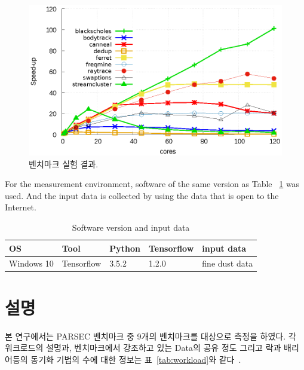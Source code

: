\documentclass{kcc}
\begin{document}
\begin{figure}[tb!]
    \centering
    \includegraphics[width=4.8in]{graph/PARSEC.eps}
    \caption{벤치마크 실험 결과.}
    \label{fig:parsec}
\end{figure}

For the measurement environment, software of the same version as Table ~\ref{tab:config} was used.
And the input data is collected by using the data that is open to the Internet.

\begin{table}[h!]
  \caption{Software version and input data}
  \centering
  \small
  \begin{tabular}{l l l l l} \toprule
    OS & Tool & Python & Tensorflow & input data\\
    \midrule
    Windows 10 & Tensorflow & 3.5.2 & 1.2.0 & fine dust data \\
    \bottomrule
  \end{tabular}
  \label{tab:config}
\end{table}


\section{ 설명}
본 연구에서는 PARSEC 벤치마크 중 9개의 벤치마크를 대상으로 측정을 하였다. 
각 워크로드의 설명과, 벤치마크에서 강조하고 있는 Data의 공유 정도 그리고
 락과 배리어등의 동기화 기법의 수에 대한 정보는  표~\ref{tab:workload}와 같다~\cite{parsecbench}.
\end{document}
